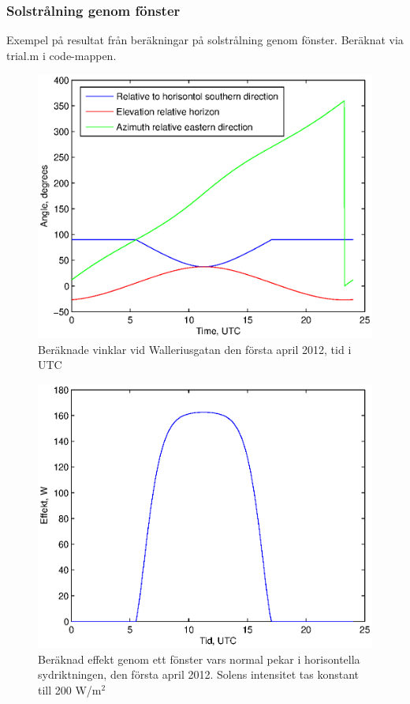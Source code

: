 \subsubsection{Solstrålning genom fönster}

Exempel på resultat från beräkningar på solstrålning genom fönster. Beräknat via trial.m i code-mappen.

\begin{figure}[hpbt]
\centering
\includegraphics[scale=1]{images/angles120401.eps}
\caption{\label{fig:vinklar120401} Beräknade vinklar vid Walleriusgatan den första april 2012, tid i UTC}
\end{figure}

\begin{figure}[hpbt]
\centering
\includegraphics[scale=1]{images/effekt120401.eps}
\caption{\label{fig:effekt120401} Beräknad effekt genom ett fönster vars normal pekar i horisontella sydriktningen, den första april 2012. Solens intensitet tas konstant till 200 W/m$^2$}
\end{figure}
